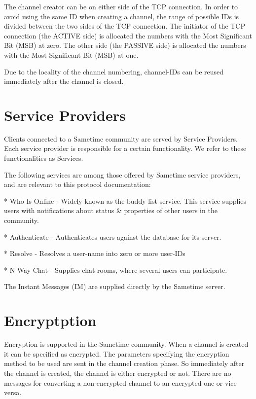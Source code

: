 \documentclass[titlepage,oneside]{book}
\begin{document}
\par{} The channel creator can be on either side of the TCP
connection. In order to avoid using the same ID when creating a
channel, the range of possible IDs is divided between the two sides of
the TCP connection.  The initiator of the TCP connection (the ACTIVE
side) is allocated the numbers with the Most Significant Bit (MSB) at
zero. The other side (the PASSIVE side) is allocated the numbers with
the Most Significant Bit (MSB) at one.

\par{} Due to the locality of the channel numbering, channel-IDs can
be reused immediately after the channel is closed.

\section{Service Providers}

\par{} Clients connected to a Sametime community are served by Service
Providers. Each service provider is responsible for a certain
functionality. We refer to these functionalities as Services.

\par{} The following services are among those offered by Sametime
service providers, and are relevant to this protocol documentation:

\par{} * Who Is Online - Widely known as the buddy list service. This
service supplies users with notifications about status & properties of
other users in the community.

\par{} * Authenticate - Authenticates users against the database for
its server.

\par{} * Resolve - Resolves a user-name into zero or more user-IDs

\par{} * N-Way Chat - Supplies chat-rooms, where several users can
participate.

\par{} The Instant Messages (IM) are supplied directly by the Sametime
server.

\section{Encryptption}

\par{} Encryption is supported in the Sametime community. When a
channel is created it can be specified as encrypted. The parameters
specifying the encryption method to be used are sent in the channel
creation phase. So immediately after the channel is created, the
channel is either encrypted or not. There are no messages for
converting a non-encrypted channel to an encrypted one or vice versa.
\end{document}

